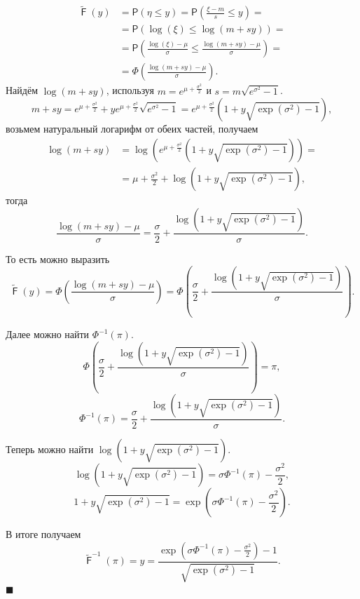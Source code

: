 \documentclass[12pt]{article}
\newenvironment{Proof}{\par\noindent{\bf Доказательство.}}{\hfill$\scriptstyle\blacksquare$}
\DeclareMathOperator{\F}{\mathsf{F}}
\begin{document}
\begin{Proof}
	\begin{align*}
		\tilde{\F}(y) &= \mathsf{P}\left(\eta\leq y \right) = \mathsf{P}\left(\frac{\xi-m}{s} \leq y \right)= \\
		&=\mathsf{P}(\log(\xi)\leq \log(m+sy))=\\
		&=\mathsf{P}\left( \frac{\log(\xi)-\mu}{\sigma}\leq \frac{\log(m+sy)-\mu}{\sigma} \right) =\\
		&=\Phi \left(\frac{\log(m+sy) - \mu}{\sigma}\right).
	\end{align*}
Найдём $\log(m+sy)$, используя $m = e^{\mu +\frac{\sigma ^{2}}{2}}$ и $s = m\sqrt{e^{\sigma ^{2}}-1}$.
\begin{equation*}
	m+sy = e^{\mu +\frac{\sigma ^{2}}{2}} + ye^{\mu +\frac{\sigma ^{2}}{2}}\sqrt{e^{\sigma ^{2}}-1} = e^{\mu +\frac{\sigma ^{2}}{2}}(1+y\sqrt{\exp(\sigma ^{2})-1}),
\end{equation*}
возьмем натуральный логарифм от обеих частей, получаем
\begin{align*}
	\log(m+sy) &= \log(e^{\mu +\frac{\sigma ^{2}}{2}}(1+y\sqrt{\exp(\sigma ^{2})-1})) =\\
	&=\mu +\frac{\sigma ^{2}}{2} + \log(1+y\sqrt{\exp(\sigma ^{2})-1}),
\end{align*}
тогда
\begin{equation*}
	\displaystyle{\frac{\log(m+sy)-\mu }{\sigma } = \frac{\sigma }{2} + \frac{\log(1+y\sqrt{\exp(\sigma ^{2})-1})}{\sigma}}.
\end{equation*}

То есть можно выразить
\begin{equation*}
	\displaystyle{\tilde{\F}(y) = \Phi \left(\frac{\log(m+sy)-\mu }{\sigma }\right) = \Phi \left(\frac{\sigma }{2} + \frac{\log(1+y\sqrt{\exp(\sigma ^{2})-1})}{\sigma}\right)}.
\end{equation*}

Далее можно найти $\Phi^{-1}(\pi)$.
\begin{equation*}
	\displaystyle{\Phi \left(\frac{\sigma }{2} + \frac{\log(1+y\sqrt{\exp(\sigma ^{2})-1})}{\sigma }\right) = \pi},
\end{equation*}
\begin{equation*}
	\displaystyle{\Phi^{-1}(\pi)=\frac{\sigma }{2} + \frac{\log(1+y\sqrt{\exp(\sigma ^{2})-1})}{\sigma}}.
\end{equation*}

Теперь можно найти $\log(1+y\sqrt{\exp(\sigma ^{2})-1})$.
\begin{equation*}
	\displaystyle{\log(1+y\sqrt{\exp(\sigma ^{2})-1}) = \sigma\Phi^{-1}(\pi) - \frac{\sigma^{2} }{2}},
\end{equation*}
\begin{equation*}
	1+y\sqrt{\exp(\sigma ^{2})-1} = \exp(\sigma\Phi^{-1}(\pi) - \frac{\sigma^{2} }{2}).
\end{equation*}

В итоге получаем
\begin{equation*}
	\displaystyle{\tilde{\F}^{-1}(\pi) = y = \frac{\exp(\sigma\Phi^{-1}(\pi) - \frac{\sigma^{2} }{2})-1}{\sqrt{\exp(\sigma ^{2})-1}}}.
\end{equation*}
\end{Proof}
	
\end{document}
